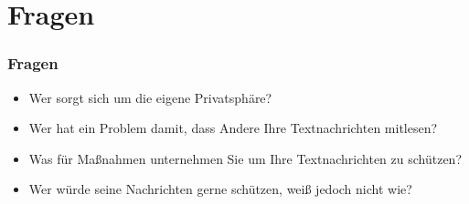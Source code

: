 \section*{Fragen}

\begin{frame}
  \frametitle{Fragen}

  \begin{itemize}
   \item Wer sorgt sich um die eigene Privatsphäre?
   \pause
   \item Wer hat ein Problem damit, dass Andere Ihre Textnachrichten mitlesen?
   \pause
   \item Was für Maßnahmen unternehmen Sie um Ihre Textnachrichten zu schützen?
   \pause
   \item Wer würde seine Nachrichten gerne schützen, weiß jedoch nicht wie?
  \end{itemize}
\end{frame}

